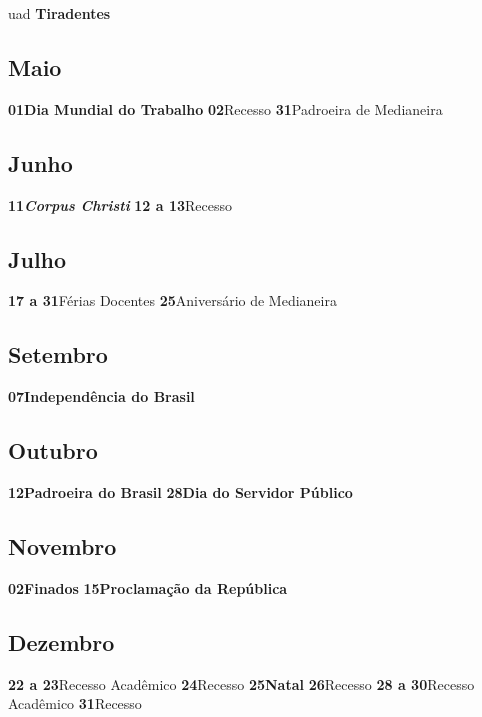 \documentclass[thesis]{hmcposter}
\begin{document}
\begin{poster}
uad \quad \textbf{Tiradentes} \newline\subsection{Maio}\textbf{01}\quad \quad \quad \quad \textbf{Dia Mundial do Trabalho} \newline\textbf{02}\quad \quad \quad \quad Recesso \newline\textbf{31}\quad \quad \quad \quad Padroeira de Medianeira \newline\subsection{Junho}\textbf{11}\quad \quad \quad \quad \textbf{\textit{Corpus Christi}} \newline\textbf{12 a 13}\quad \quad Recesso \newline\subsection{Julho}\textbf{17 a 31}\quad \quad Férias Docentes \newline\textbf{25}\quad \quad \quad \quad Aniversário de Medianeira \newline\subsection{Setembro}\textbf{07}\quad \quad \quad \quad \textbf{Independência do Brasil} \newline\subsection{Outubro}\textbf{12}\quad \quad \quad \quad \textbf{Padroeira do Brasil} \newline\textbf{28}\quad \quad \quad \quad \textbf{Dia do Servidor Público} \newline\subsection{Novembro}\textbf{02}\quad \quad \quad \quad \textbf{Finados} \newline\textbf{15}\quad \quad \quad \quad \textbf{Proclamação da República} \newline\subsection{Dezembro}\textbf{22 a 23}\quad \quad Recesso Acadêmico \newline\textbf{24}\quad \quad \quad \quad Recesso \newline\textbf{25}\quad \quad \quad \quad \textbf{Natal} \newline\textbf{26}\quad \quad \quad \quad Recesso \newline\textbf{28 a 30}\quad \quad Recesso Acadêmico \newline\textbf{31}\quad \quad \quad \quad Recesso \newline\newpage

\end{poster}
\end{document}

